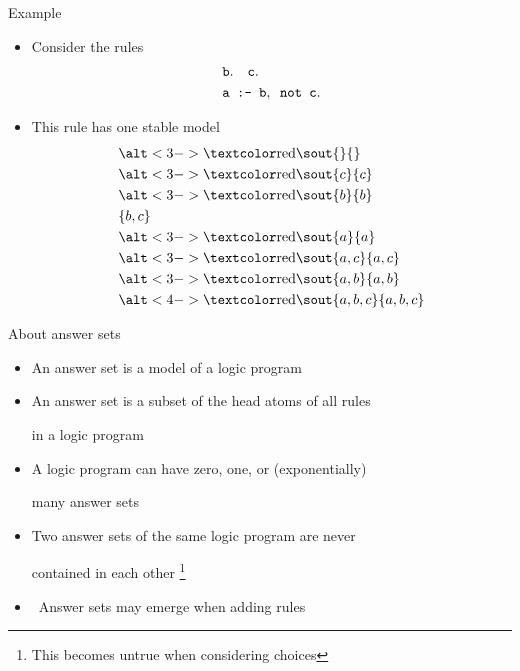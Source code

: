 \begin{frame}[c]{Example}
  \begin{itemize}
  \item Consider the rules
    \begin{align*}
      &{\tt b.\quad   c.}\\
      &{\tt a\texttt{ :- } b,\texttt{ not }c.}
    \end{align*}
  \item <2-> This rule has one stable model
    \begin{align*}
      &\STROUT{3-}{}\\
      &\STROUT{3-}{c}\\
      &\STROUT{3-}{b}\\
      &\{b,c\}\\
      &\STROUT{3-}{a}\\
      &\STROUT{3-}{a,c}\\
      &\STROUT{3-}{a,b}\\
      &\STROUT{4-}{a,b,c}
    \end{align*}
  \end{itemize}
\end{frame}
\begin{frame}{About answer sets}
  \bigskip
  \begin{itemize}
  \item An answer set is a model of a logic program
    \smallskip
  \item An answer set is a subset of the head atoms of all rules\par in a logic program
    \smallskip
  \item A logic program can have zero, one, or (exponentially)\par many answer sets
    \smallskip
  \item Two answer sets of the same logic program are never\par contained in each other
    \footnote{This becomes untrue when considering choices}
    \bigskip
  \item<2->  \ Answer sets may emerge when adding rules
  \end{itemize}
\end{frame}
